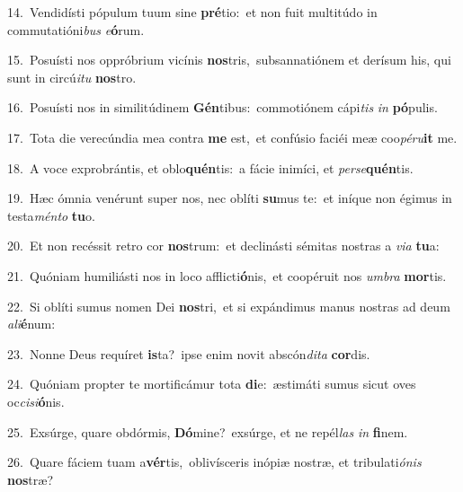 {\numbfont\textcolor{\numbcolor}{14.}}~Vendidísti pópulum tuum sine \textbf{pré}\-tio:~\star et non fuit multitúdo in commutatióni\textit{bus} \textit{e}\-\textbf{ó}rum.\par
{\numbfont\textcolor{\numbcolor}{15.}}~Posuísti nos oppróbrium vicínis \textbf{nos}\-tris,~\star subsannatiónem et derísum his, qui sunt in circú\-\textit{i}\-\textit{tu} \textbf{nos}\-tro.\par
{\numbfont\textcolor{\numbcolor}{16.}}~Posuísti nos in similitúdinem \textbf{Gén}\-tibus:~\star commotiónem cápi\textit{tis} \textit{in} \textbf{pó}\-pulis.\par
{\numbfont\textcolor{\numbcolor}{17.}}~Tota die verecúndia mea contra \textbf{me} est,~\star et confúsio faciéi meæ coo\-\textit{pé}\-\textit{ru}\textbf{it} me.\par
{\numbfont\textcolor{\numbcolor}{18.}}~A voce exprobrántis, et oblo\-\textbf{quén}\-tis:~\star a fácie inimíci, et \textit{per}\-\textit{se}\textbf{quén}tis.\par
{\numbfont\textcolor{\numbcolor}{19.}}~Hæc ómnia venérunt super nos, nec oblíti \textbf{su}\-mus te:~\star et iníque non égimus in testa\-\textit{mén}\-\textit{to} \textbf{tu}\-o.\par
{\numbfont\textcolor{\numbcolor}{20.}}~Et non recéssit retro cor \textbf{nos}\-trum:~\star et declinásti sémitas nostras a \textit{vi}\-\textit{a} \textbf{tu}\-a:\par
{\numbfont\textcolor{\numbcolor}{21.}}~Quóniam humiliásti nos in loco afflicti\-\textbf{ó}\-nis,~\star et coopéruit nos \textit{um}\-\textit{bra} \textbf{mor}\-tis.\par
{\numbfont\textcolor{\numbcolor}{22.}}~Si oblíti sumus nomen Dei \textbf{nos}\-tri,~\star et si expándimus manus nostras ad deum \textit{a}\-\textit{li}\textbf{é}num:\par
{\numbfont\textcolor{\numbcolor}{23.}}~Nonne Deus requíret \textbf{is}\-ta?~\star ipse enim novit abscón\-\textit{di}\-\textit{ta} \textbf{cor}\-dis.\par
{\numbfont\textcolor{\numbcolor}{24.}}~Quóniam propter te mortificámur tota \textbf{di}\-e:~\star æstimáti sumus sicut oves oc\-\textit{ci}\-\textit{si}\textbf{ó}nis.\par
{\numbfont\textcolor{\numbcolor}{25.}}~Exsúrge, quare obdórmis, \textbf{Dó}\-mine?~\star exsúrge, et ne repél\textit{las} \textit{in} \textbf{fi}\-nem.\par
{\numbfont\textcolor{\numbcolor}{26.}}~Quare fáciem tuam a\-\textbf{vér}\-tis,~\star oblivísceris inópiæ nostræ, et tribulati\-\textit{ó}\-\textit{nis} \textbf{nos}\-træ?\par
